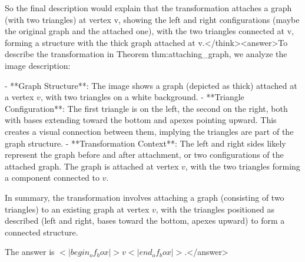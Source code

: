 So the final description would explain that the transformation attaches a graph (with two triangles) at vertex v, showing the left and right configurations (maybe the original graph and the attached one), with the two triangles connected at v, forming a structure with the thick graph attached at v.</think><answer>To describe the transformation in Theorem thm:attaching_graph, we analyze the image description:  

- **Graph Structure**: The image shows a graph (depicted as thick) attached at a vertex \( v \), with two triangles on a white background.  
- **Triangle Configuration**: The first triangle is on the left, the second on the right, both with bases extending toward the bottom and apexes pointing upward. This creates a visual connection between them, implying the triangles are part of the graph structure.  
- **Transformation Context**: The left and right sides likely represent the graph before and after attachment, or two configurations of the attached graph. The graph is attached at vertex \( v \), with the two triangles forming a component connected to \( v \).  

In summary, the transformation involves attaching a graph (consisting of two triangles) to an existing graph at vertex \( v \), with the triangles positioned as described (left and right, bases toward the bottom, apexes upward) to form a connected structure.  

The answer is \(<|begin_of_box|>v<|end_of_box|>\).</answer>